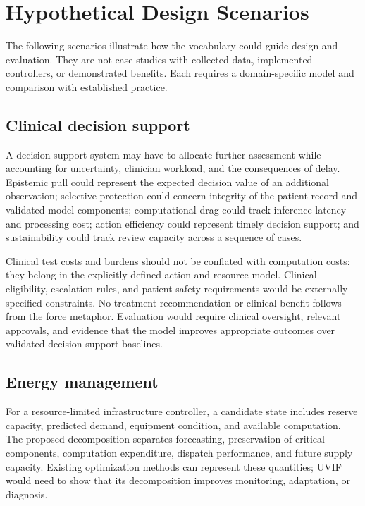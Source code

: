 \section{Hypothetical Design Scenarios}
\label{sec:case_studies}

The following scenarios illustrate how the vocabulary could guide design and evaluation. They are not case studies with collected data, implemented controllers, or demonstrated benefits. Each requires a domain-specific model and comparison with established practice.

\subsection{Clinical decision support}
A decision-support system may have to allocate further assessment while accounting for uncertainty, clinician workload, and the consequences of delay. Epistemic pull could represent the expected decision value of an additional observation; selective protection could concern integrity of the patient record and validated model components; computational drag could track inference latency and processing cost; action efficiency could represent timely decision support; and sustainability could track review capacity across a sequence of cases.

Clinical test costs and burdens should not be conflated with computation costs: they belong in the explicitly defined action and resource model. Clinical eligibility, escalation rules, and patient safety requirements would be externally specified constraints. No treatment recommendation or clinical benefit follows from the force metaphor. Evaluation would require clinical oversight, relevant approvals, and evidence that the model improves appropriate outcomes over validated decision-support baselines.

\subsection{Energy management}
For a resource-limited infrastructure controller, a candidate state includes reserve capacity, predicted demand, equipment condition, and available computation. The proposed decomposition separates forecasting, preservation of critical components, computation expenditure, dispatch performance, and future supply capacity. Existing optimization methods can represent these quantities; UVIF would need to show that its decomposition improves monitoring, adaptation, or diagnosis.

